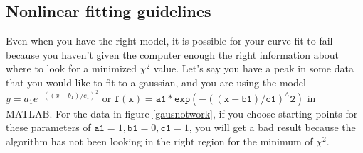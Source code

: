 \subsection{Nonlinear fitting guidelines} \label{nonfitguid}


Even when you have the right model, it is possible for your curve-fit to fail because you haven't given the computer enough the right information about where to look for a minimized $\chi^2$ value.
 Let's say you have a peak in some data that you would like to fit to a gaussian, and you are using the  model $y = a_1 e^{-((x - b_1)/c_1)^2}$ or $ \mathtt{f(x)} =  \mathtt{a1}*\mathtt{exp}(-((\mathtt{x-b1})/\mathtt{c1})^\wedge \mathtt{ 2})$ in MATLAB. For the data in figure \ref{gausnotwork}, if you choose starting points for these parameters of $\texttt{a1} = 1, \texttt{b1} = 0, \texttt{c1} = 1$, you will get a bad result because the algorithm has not been looking in the right region for the minimum of $\chi^2$. 
 
